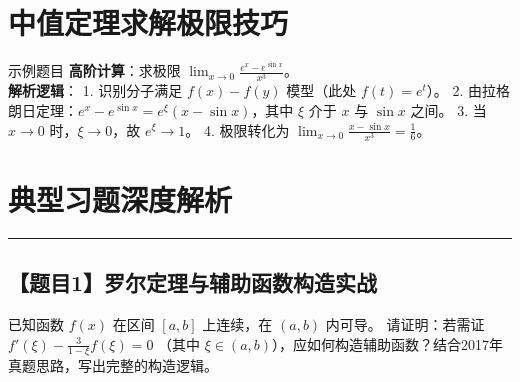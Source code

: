 \documentclass[UTF8]{ctexart}
\newcommand{\problemrule}{\noindent\rule{\textwidth}{1.5pt}\vspace{-0.8em}}
\begin{document}
\section{中值定理求解极限技巧}
\begin{examnote}{示例题目}
\textbf{高阶计算}：求极限 $\lim_{x \to 0} \frac{e^x - e^{\sin x}}{x^3}$。\\
\textbf{解析逻辑}：
1. 识别分子满足 $f(x)-f(y)$ 模型（此处 $f(t)=e^t$）。
2. 由拉格朗日定理：$e^x - e^{\sin x} = e^\xi (x - \sin x)$，其中 $\xi$ 介于 $x$ 与 $\sin x$ 之间。
3. 当 $x \to 0$ 时，$\xi \to 0$，故 $e^\xi \to 1$。
4. 极限转化为 $\lim_{x \to 0} \frac{x - \sin x}{x^3} = \frac{1}{6}$。
\end{examnote}


\section{典型习题深度解析}

\problemrule
\subsection*{【题目1】罗尔定理与辅助函数构造实战}
已知函数 $f(x)$ 在区间 $[a, b]$ 上连续，在 $(a, b)$ 内可导。
请证明：若需证 $f'(\xi) - \frac{3}{1-\xi}f(\xi) = 0$ （其中 $\xi \in (a, b)$），应如何构造辅助函数？结合2017年真题思路，写出完整的构造逻辑。
\end{document}
